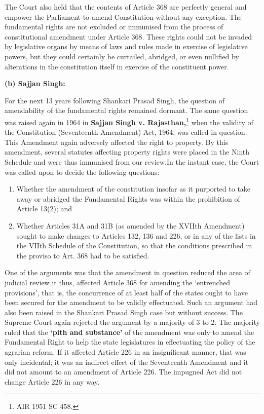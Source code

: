 \begin{multicols}{2}
\noi
The Court also held that the contents of Article 368 are perfectly general and empower the
Parliament to amend Constitution without any exception. The fundamental rights are not excluded
or immunised from the process of constitutional amendment under Article 368. These rights could
not be invaded by legislative organs by means of laws and rules made in exercise of legislative
powers, but they could certainly be curtailed, abridged, or even nullified by alterations in the
constitution itself in exercise of the constituent power.

\noi
{\large \bfseries (b) Sajjan Singh:}

\noi
For the next 13 years following Shankari Prasad Singh, the question of amendability of the
fundamental rights remained dormant. The same question was raised again in 1964 in \textbf{Sajjan Singh v. Rajasthan,}\footnote{AIR 1951 SC 458.} when the validity of the Constitution (Seventeenth Amendment) Act,
1964, was called in question. This Amendment again adversely affected the right to property. By
this amendment, several statutes affecting property rights were placed in the Ninth Schedule and
were thus immunised from our review.In the instant case, the Court was called upon to decide the
following questions: 

\vspace{-.3cm}

\begin{enumerate}
\itemsep=0pt
\item[(1)] Whether the amendment of the constitution insofar as it purported to take away or abridged
the Fundamental Rights was within the prohibition of Article 13(2); and

\item[(2)] Whether Articles 31A and 31B (as amended by the XVIIth Amendment) sought to make
changes to Articles 132, 136 and 226, or in any of the lists in the VIIth Schedule of the
Constitution, so that the conditions prescribed in the proviso to Art. 368 had to be satisfied.
\end{enumerate}

\vspace{-.3cm}

\noi
One of the arguments was that the amendment in question reduced the area of judicial review it
thus, affected Article 368 for amending the ‘entrenched provisions’, that is, the concurrence of at
least half of the states ought to have been secured for the amendment to be validly effectuated.
Such an argument had also been raised in the Shankari Prasad Singh case but without success.
The Supreme Court again rejected the argument by a majority of 3 to 2. The majority ruled that
the \textbf{‘pith and substance’} of the amendment was only to amend the Fundamental Right to help
the state legislatures in effectuating the policy of the agrarian reform. If it affected Article 226 in
an insignificant manner, that was only incidental; it was an indirect effect of the Seventeenth
Amendment and it did not amount to an amendment of Article 226. The impugned Act did not
change Article 226 in any way.


\end{multicols}
